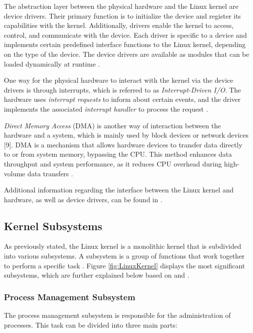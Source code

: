 The abstraction layer between the physical hardware and the Linux kernel are device drivers. Their primary function is to initialize the device and register its capabilities with the kernel. Additionally, drivers enable the kernel to access, control, and communicate with the device. Each driver is specific to a device and implements certain predefined interface functions to the Linux kernel, depending on the type of the device. The device drivers are available as modules that can be loaded dynamically at runtime \cite{like09}.

One way for the physical hardware to interact with the kernel via the device drivers is through interrupts, which is referred to as \textit{Interrupt-Driven I/O}. The hardware uses \textit{interrupt requests} to inform about certain events, and the driver implements the associated \textit{interrupt handler} to process the request \cite{like09}.

\textit{Direct Memory Access} (DMA) is another way of interaction between the hardware and a system, which is mainly used by block devices or network devices [9]. DMA is a mechanism that allows hardware devices to transfer data directly to or from system memory, bypassing the CPU. This method enhances data throughput and system performance, as it reduces CPU overhead during high-volume data transfers \cite{like05}.

Additional information regarding the interface between the Linux kernel and hardware, as well as device drivers, can be found in \cite{like09}.


\subsection{Kernel Subsystems}

As previously stated, the Linux kernel is a monolithic kernel that is subdivided into various subsystems. A subsystem is a group of functions that work together to perform a specific task \cite{like10}. Figure \ref{fig:LinuxKernel} displays the most significant subsystems, which are further explained below based on \cite{like03} and \cite{like09}.

\subsubsection{Process Management Subsystem}
The process management subsystem is responsible for the administration of processes. This task can be divided into three main parts:

